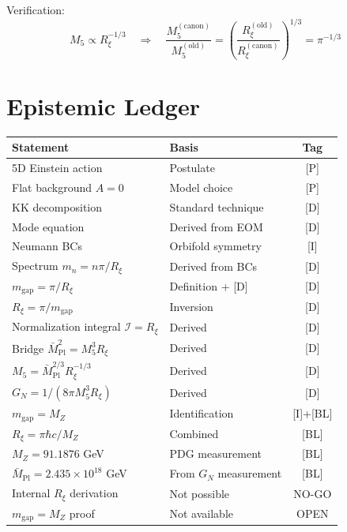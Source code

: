 \documentclass[11pt,a4paper]{article}
\newcommand{\Rxi}{R_\xi}
\newcommand{\Mplbar}{\bar{M}_{\mathrm{Pl}}}
\newcommand{\Mfive}{M_5}
\newcommand{\calI}{\mathcal{I}}
\newcommand{\GN}{G_N}
\newcommand{\MZ}{M_Z}
\newcommand{\mgap}{m_{\mathrm{gap}}}
\begin{document}
Verification:
\begin{equation}
\Mfive \propto \Rxi^{-1/3} \quad \Rightarrow \quad
\frac{\Mfive^{\mathrm{(canon)}}}{\Mfive^{\mathrm{(old)}}} =
\left(\frac{\Rxi^{\mathrm{(old)}}}{\Rxi^{\mathrm{(canon)}}}\right)^{1/3} = \pi^{-1/3}
\label{eq:M5-map-check}
\end{equation}

\section{Epistemic Ledger}

\begin{tcolorbox}[title=Final Epistemic Ledger, colback=yellow!10, colframe=orange!50]
\begin{center}
\begin{tabular}{llc}
\toprule
\textbf{Statement} & \textbf{Basis} & \textbf{Tag} \\
\midrule
5D Einstein action & Postulate & [P] \\
Flat background $A = 0$ & Model choice & [P] \\
KK decomposition & Standard technique & [D] \\
Mode equation & Derived from EOM & [D] \\
Neumann BCs & Orbifold symmetry & [I] \\
Spectrum $m_n = n\pi/\Rxi$ & Derived from BCs & [D] \\
$\mgap = \pi/\Rxi$ & Definition + [D] & [D] \\
$\Rxi = \pi/\mgap$ & Inversion & [D] \\
Normalization integral $\calI = \Rxi$ & Derived & [D] \\
Bridge $\Mplbar^2 = \Mfive^3 \Rxi$ & Derived & [D] \\
$\Mfive = \Mplbar^{2/3}\Rxi^{-1/3}$ & Derived & [D] \\
$\GN = 1/(8\pi\Mfive^3\Rxi)$ & Derived & [D] \\
\midrule
$\mgap = \MZ$ & Identification & [I]+[BL] \\
$\Rxi = \pi\hbar c/\MZ$ & Combined & [BL] \\
$\MZ = 91.1876$ GeV & PDG measurement & [BL] \\
$\Mplbar = 2.435 \times 10^{18}$ GeV & From $\GN$ measurement & [BL] \\
\midrule
Internal $\Rxi$ derivation & Not possible & NO-GO \\
$\mgap = \MZ$ proof & Not available & OPEN \\
\bottomrule
\end{tabular}
\end{center}


\end{tcolorbox}
\end{document}

